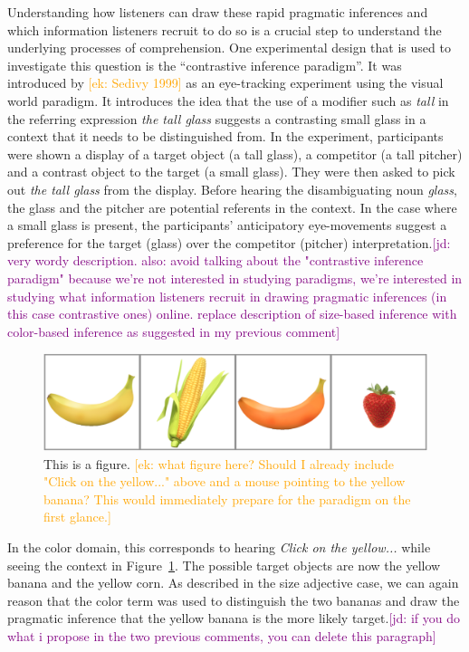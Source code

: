 \documentclass[10pt,letterpaper]{article}
\newcommand{\ek}[1]{\textcolor{Orange}{[ek: #1]}}
\newcommand{\jd}[1]{\textcolor{Purple}{[jd: #1]}}
\begin{document}
Understanding how listeners can draw these rapid pragmatic inferences and which information listeners recruit to do so is a crucial step to understand the underlying processes of comprehension. One experimental design that is used to investigate this question is the ``contrastive inference paradigm''. It was introduced by \ek{Sedivy 1999} as an eye-tracking experiment using the visual world paradigm. It introduces the idea that the use of a modifier such as \textit{tall} in the referring expression \textit{the tall glass} suggests a contrasting small glass in a context that it needs to be distinguished from. In the experiment, participants were shown a display of a target object (a tall glass), a competitor (a tall pitcher) and a contrast object to the target (a small glass). They were then asked to pick out \textit{the tall glass} from the display. Before hearing the disambiguating noun \textit{glass}, the glass and the pitcher are potential referents in the context. In the case where a small glass is present, the participants' anticipatory eye-movements suggest a preference for the target (glass) over the competitor (pitcher) interpretation.\jd{very wordy description. also: avoid talking about the "contrastive inference paradigm" because we're not interested in studying paradigms, we're interested in studying what information listeners recruit in drawing pragmatic inferences (in this case contrastive ones) online. replace description of size-based inference with color-based inference as suggested in my previous comment}

\begin{figure}
	\begin{center}
		\includegraphics[width=.475\textwidth]{graphs/example-context.pdf}
	\end{center}
\caption{This is a figure. \ek{what figure here? Should I already include "Click on the yellow..." above and a mouse pointing to the yellow banana? This would immediately prepare for the paradigm on the first glance.}} 
\label{example-context}
\end{figure}

In the color domain, this corresponds to hearing \textit{Click on the yellow...} while seeing the context in Figure~\ref{example-context}. The possible target objects are now the yellow banana and the yellow corn. As described in the size adjective case, we can again reason that the color term was used to distinguish the two bananas and draw the pragmatic inference that the yellow banana is the more likely target.\jd{if you do what i propose in the two previous comments, you can delete this paragraph}
\end{document}
